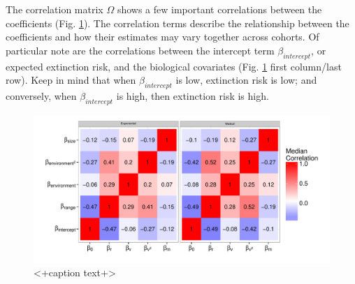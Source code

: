 \documentclass[12pt,letterpaper]{article}
\begin{document}
The correlation matrix \(\Omega\) shows a few important correlations between the coefficients (Fig. \ref{fig:omega}). The correlation terms describe the relationship between the coefficients and how their estimates may vary together across cohorts. Of particular note are the correlations between the intercept term \(\beta_{intercept}\), or expected extinction risk, and the biological covariates (Fig. \ref{fig:omega} first column/last row). Keep in mind that when \(\beta_{intercept}\) is low, extinction risk is low; and conversely, when \(\beta_{intercept}\) is high, then extinction risk is high.
\begin{figure}[ht]
  \centering
  \includegraphics[height = 0.5\textheight,width=\textwidth,keepaspectratio=true]{figure/correlation_heatmap}
  \caption{<+caption text+>}
  \label{fig:omega}
\end{figure}
\end{document}
